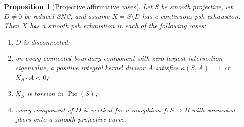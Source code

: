 \documentclass[11pt]{amsart}
\newtheorem{proposition}[theorem]{Proposition}
\theoremstyle{definition}
\theoremstyle{remark}
\numberwithin{equation}{section}
\begin{document}
\begin{proposition}[Projective affirmative cases]
\label{prop:surface-projective-cases}
Let $S$ be smooth projective, let $D\ne0$ be reduced SNC, and assume
$X=S\setminus D$ has a continuous psh exhaustion. Then $X$ has a
smooth psh exhaustion in each of the following cases:
\begin{enumerate}[label=\textup{(\roman*)},leftmargin=2.5em]
\item $D$ is disconnected;
\item on every connected boundary component with zero largest
intersection eigenvalue, a positive integral kernel divisor $A$
satisfies $\kappa(S,A)=1$ or $K_S\cdot A<0$;
\item $K_S$ is torsion in $\operatorname{Pic}(S)$;
\item every component of $D$ is vertical for a morphism
$f:S\to B$ with connected fibers onto a smooth projective curve.
\end{enumerate}
\end{proposition}
\end{document}
